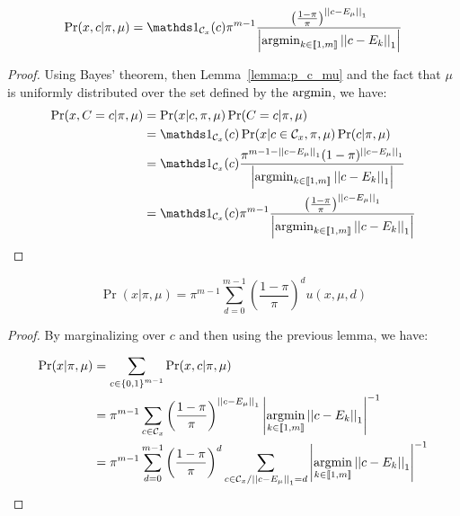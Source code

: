 \begin{lemma}
    \label{lemma:p_x_c_knowing_pi_mu_appendix}
    \[\Pr(x, c | \pi, \mu) = \indic{}_{\mathcal{C}_x}(c) \pi^{m-1}  \frac{\left(\frac{1 - \pi}{\pi}\right)^{\norm{c - E_{\mu}}_1}}{\card{\argmin_{k \in \bbrack{1, m}} \norm{c - E_k}_1}} \]
\end{lemma}
\begin{proof}
    Using Bayes' theorem, then Lemma~\ref{lemma:p_c_mu} and the fact that $\mu$ is uniformly distributed over the set defined by the $\operatorname*{argmin}$, we have:
    \begin{align}
        \Pr(x, C=c | \pi, \mu)
        &= \Pr(x | c, \pi, \mu) \Pr(C = c | \pi, \mu)\\
        &=  \indic{}_{\mathcal{C}_x}(c) \Pr(x | c \in \mathcal{C}_x, \pi, \mu) \Pr(c | \pi, \mu)\\
        &= \indic{}_{\mathcal{C}_x}(c) \frac{\pi^{m - 1 - \norm{c - E_{\mu}}_1} (1 - \pi)^{\norm{c - E_{\mu}}_1}}{\card{\argmin_{k \in \bbrack{1, m}} \norm{c - E_k}_1}}\\
        &= \indic{}_{\mathcal{C}_x}(c) \pi^{m-1}  \frac{\left(\frac{1 - \pi}{\pi}\right)^{\norm{c - E_{\mu}}_1}}{\card{\argmin_{k \in \bbrack{1, m}} \norm{c - E_k}_1}}
    \end{align}
\end{proof}


\begin{thm}
    \label{thm:p_x_knowing_pi_mu}
    \[\Pr(x | \pi, \mu) = \pi^{m-1} \sum_{d = 0}^{m-1} \left(\frac{1 - \pi}{\pi}\right)^d u(x, \mu, d)\]
\end{thm}
\begin{proof}
    By marginalizing over $c$ and then using the previous lemma, we have:

\begin{align}
    \Pr(x | \pi, \mu)
    &= \sum_{c \in \left\{ 0, 1 \right\}^{m-1}} \Pr(x, c | \pi, \mu)\\
    &= \pi^{m-1} \sum_{c \in \mathcal{C}_x} \left(\frac{1 - \pi}{\pi}\right)^{\left|\left|c - E_{\mu}\right|\right|_1} \left|\operatorname*{argmin}_{k \in \left\llbracket1, m\right\rrbracket} \left|\left|c - E_k\right|\right|_1\right|^{-1}\\
    &= \pi^{m-1} \sum_{d = 0}^{m-1} \left(\frac{1 - \pi}{\pi}\right)^d \sum_{c \in \mathcal{C}_x / \left|\left|c - E_{\mu}\right|\right|_1 = d}  \left|\operatorname*{argmin}_{k \in \left\llbracket1, m\right\rrbracket} \left|\left|c - E_k\right|\right|_1\right|^{-1}
\end{align}
\end{proof}



